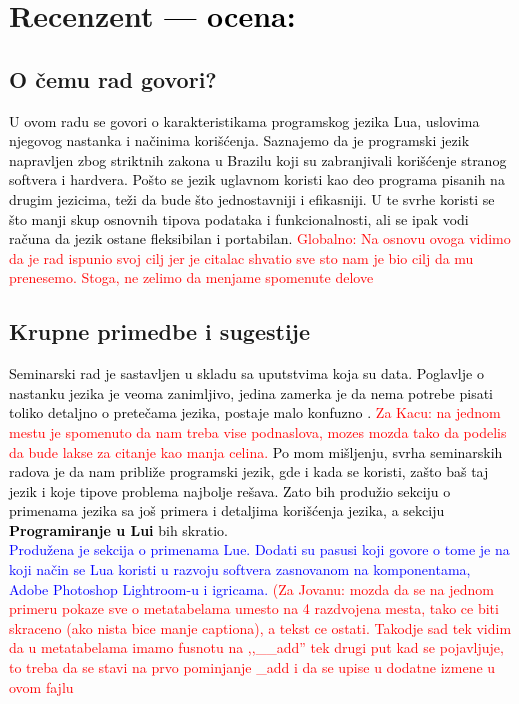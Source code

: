 \documentclass[a4paper]{report}
\newcommand{\odgovor}[1]{\textcolor{black}{#1}}
\newcommand{\odgovorAutora}[1]{\textcolor{blue}{#1}}
\newcommand{\note}[1]{\textcolor{red}{#1}}
\begin{document}
\chapter{Recenzent \odgovor{--- ocena:} }


\section{O čemu rad govori?}
\odgovor{
U ovom radu se govori o karakteristikama programskog jezika Lua, uslovima njegovog nastanka i načinima korišćenja. Saznajemo da je programski jezik napravljen zbog striktnih zakona u Brazilu koji su zabranjivali korišćenje stranog softvera i hardvera. Pošto se jezik uglavnom koristi kao deo programa pisanih na drugim jezicima, teži da bude što jednostavniji i efikasniji. U te svrhe koristi se što manji skup osnovnih tipova podataka i funkcionalnosti, ali se ipak vodi računa da jezik ostane fleksibilan i portabilan. 
}
\note{Globalno: Na osnovu ovoga vidimo da je rad ispunio svoj cilj jer je citalac shvatio sve sto nam je bio cilj da mu prenesemo. Stoga, ne zelimo da menjame spomenute delove}

\section{Krupne primedbe i sugestije}
\odgovor{
Seminarski rad je sastavljen u skladu sa uputstvima koja su data. Poglavlje o nastanku jezika je veoma zanimljivo, jedina zamerka je da nema potrebe pisati toliko detaljno o pretečama jezika, postaje malo konfuzno .\newline
\note{Za Kacu: na jednom mestu je spomenuto da nam treba vise podnaslova, mozes mozda tako da podelis da bude lakse za citanje kao manja celina.}
Po mom mišljenju, svrha seminarskih radova je da nam približe programski jezik, gde i kada se koristi, zašto baš taj jezik i koje tipove problema najbolje rešava. Zato bih produžio sekciju o primenama jezika sa još primera i detaljima korišćenja jezika, a sekciju 
\textbf{Programiranje u Lui} bih skratio.\\
\odgovorAutora{Produžena je sekcija o primenama Lue. Dodati su pasusi koji govore o tome je na koji način se Lua koristi u razvoju softvera zasnovanom na komponentama, Adobe Photoshop Lightroom-u i igricama.}
\note{(Za Jovanu: mozda da se na jednom primeru pokaze sve o metatabelama umesto na 4 razdvojena mesta, tako ce biti skraceno (ako nista bice manje captiona), a tekst ce ostati. Takodje sad tek vidim da u metatabelama imamo fusnotu na ,,\_\_add'' tek drugi put kad se pojavljuje, to treba da se stavi na prvo pominjanje \_add i da se upise u dodatne izmene u ovom fajlu}  
}
\end{document}
